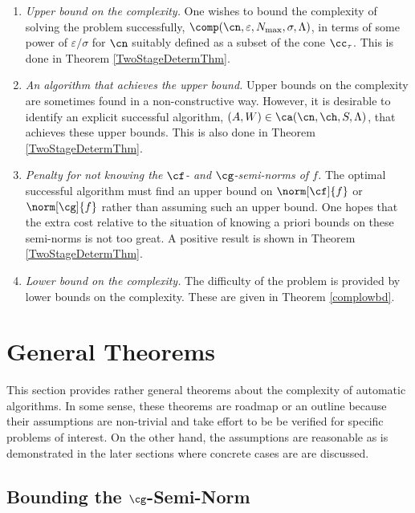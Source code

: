 \documentclass[final]{elsarticle}
\theoremstyle{definition}
\theoremstyle{remark}
\begin{document}
\begin{enumerate}

\renewcommand{\labelenumi}{\roman{enumi}.}

\item \emph{Upper bound on the complexity.}
One wishes to bound the complexity of solving the problem successfully, $\comp(\cn,\varepsilon,N_{\max},\sigma,\Lambda)$, in terms of some power of $\varepsilon/\sigma$ for $\cn$ suitably defined as a subset of the cone $\cc_{\tau}$.  This is done in Theorem \ref{TwoStageDetermThm}.

\item \emph{An algorithm that achieves the upper bound.}  Upper bounds on the complexity are sometimes found in a non-constructive way.  However, it is desirable to identify an explicit successful algorithm, $(A,W) \in \ca(\cn,\ch,S,\Lambda)$, that achieves these upper bounds.  This is also done in Theorem \ref{TwoStageDetermThm}.

\item \emph{Penalty for not knowing the $\cf$- and $\cg$-semi-norms of $f$.} The optimal successful algorithm must find an upper bound on $\norm[\cf]{f}$ or $\norm[\cg]{f}$ rather than assuming such an upper bound.  One hopes that the extra cost relative to the situation of knowing a priori bounds on these semi-norms is not too great.  A positive result is shown in Theorem \ref{TwoStageDetermThm}.

\item \emph{Lower bound on the complexity.}  The difficulty of the problem is provided by lower bounds on the complexity.  These are given in Theorem \ref{complowbd}.

\end{enumerate}

\section{General Theorems}

This section provides rather general theorems about the complexity of automatic algorithms.  In some sense, these theorems are roadmap or an outline because their assumptions are non-trivial and take effort to be be verified for specific problems of interest.  On the other hand, the assumptions are reasonable as is demonstrated in the later sections where concrete cases are are discussed.  

\subsection{Bounding the $\cg$-Semi-Norm}
\end{document}
